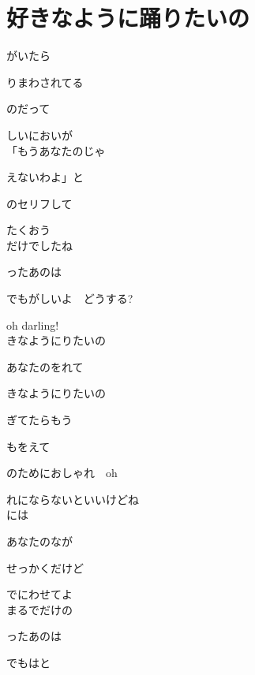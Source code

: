 \section{ 好きなように踊りたいの}
\large{

がいたら

りまわされてる

のだって

しいにおいが
\\

「もうあなたのじゃ

えないわよ」と

のセリフして

たくおう
\\

だけでしたね

ったあのは

でもがしいよ　どうする?

oh darling!
\\

きなようにりたいの

あなたのをれて

きなようにりたいの

ぎてたらもう

もをえて

のためにおしゃれ　oh

れにならないといいけどね
\\

には

あなたのなが

せっかくだけど

でにわせてよ
\\

まるでだけの

ったあのは

でもはと

}
